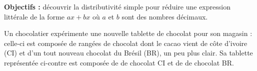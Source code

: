 \begin{changemargin}{-10mm}{-15mm}
    \begin{activite}
        {\bf Objectifs :} découvrir la distributivité simple pour réduire une expression littérale de la forme $ax+bx$ où $a$ et $b$ sont des nombres décimaux.

        \smallskip
        \begin{minipage}{0.7\linewidth}
        Un chocolatier expérimente une nouvelle tablette de chocolat pour son magasin : celle-ci est composée de rangées de chocolat dont le cacao vient de côte d'ivoire (CI) et d'un tout nouveau chocolat du Brésil (BR), un peu plus clair. Sa tablette représentée ci-contre est composée de  de chocolat CI et de  de chocolat BR.
        \end{minipage}
        \begin{minipage}{0.3\linewidth}
           \begin{center}
           \end{center}
        \end{minipage}


\end{activite}
\end{changemargin}
